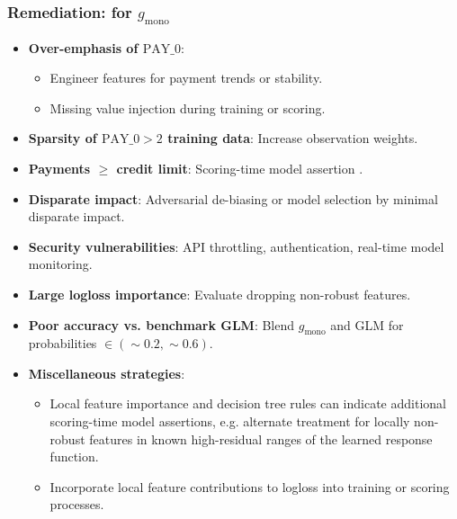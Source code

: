 \documentclass[11pt,
               aspectratio=169,
               hyperref={colorlinks}
               ]{beamer}
\begin{document}
			\begin{frame}
		
				\frametitle{\textbf{Remediation}: for $g_{\text{mono}}$}
				
				\begin{itemize}\scriptsize
					\item \textbf{Over-emphasis of $\text{PAY\_0}$}:
					\begin{itemize}\scriptsize
						\item Engineer features for payment trends or stability.
						\item Missing value injection during training or scoring.
					\end{itemize}
					\item \textbf{Sparsity of $\text{PAY\_0} > 2$ training data}: Increase observation weights. 
					\item \textbf{Payments $\geq$ credit limit}: Scoring-time model assertion \cite{kangdebugging}. 
					\item \textbf{Disparate impact}: Adversarial de-biasing \cite{zhang2018mitigating} or model selection by minimal disparate impact. 
					\item \textbf{Security vulnerabilities}: API throttling, authentication, real-time model monitoring. 
					\item \textbf{Large logloss importance}: Evaluate dropping non-robust features.
					\item \textbf{Poor accuracy vs. benchmark GLM}: Blend $g_{\text{mono}}$ and GLM for probabilities $\in (\sim0.2, \sim0.6)$.
					\item \textbf{Miscellaneous strategies}: 
					\begin{itemize}\scriptsize
						\item Local feature importance and decision tree rules can indicate additional scoring-time model assertions, e.g. alternate treatment for locally non-robust features in known high-residual ranges of the learned response function. 
						\item Incorporate local feature contributions to logloss into training or scoring processes.
					\end{itemize}
				\end{itemize}
				\normalsize

			\end{frame}		
			
\end{document}
